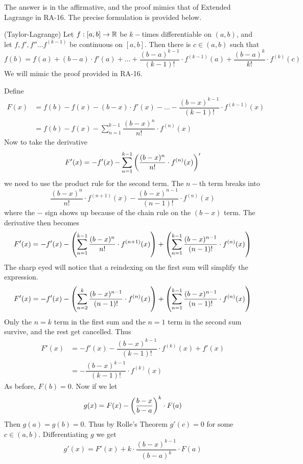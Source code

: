 The answer is in the affirmative, and the proof mimics that of Extended Lagrange in RA-16. The precise formulation is provided below.
\begin{SWP}{\thm}{(Taylor-Lagrange) Let $f:[a, b] \rightarrow \mathbb{R}$ be $k-$times differentiable on $(a, b)$, and let $f ,f', f'' \ldots f^{(k - 1)}$ be continuous on $[a, b]$. Then there is $c \in (a, b)$ such that
$$
f(b) = f(a) + (b - a)\cdot f'(a) + \ldots + \dfrac{(b - a)^{k - 1}}{(k - 1)!}\cdot f^{(k - 1)}(a) + \dfrac{(b - a)^k}{k!}\cdot f^{(k)}(c)
$$}We will mimic the proof provided in RA-16.

Define
\begin{align*}	
F(x) &= f(b) - f(x) - (b - x)\cdot f'(x) - \ldots - \dfrac{(b - x)^{k - 1}}{(k - 1)!}\cdot f^{(k - 1)}(x)\\
     &= f(b) - f(x) - \sum\limits_{n = 1}^{k - 1}\dfrac{(b - x)^n}{n!}\cdot f^{(n)}(x)
\end{align*}
Now to take the derivative
\begin{align*}
F'(x) = - f'(x) - \sum\limits_{n = 1}^{k - 1}\left ( {\dfrac{(b - x)^n}{n!}\cdot f^{(n)}(x)} \right )'
\end{align*}
we need to use the product rule for the second term. The $n-$th term breaks into
$$
\dfrac{(b - x)^n}{n!}\cdot f^{(n + 1)}(x) - \dfrac{(b - x)^{n - 1}}{(n - 1)!}\cdot f^{(n)}(x)
$$
where the $-$ sign shows up because of the chain rule on the $(b - x)$ term. The derivative then becomes
$$
F'(x) = -f'(x) - \left ( {\sum\limits_{n = 1}^{k - 1}\dfrac{(b - x)^n}{n!}\cdot f^{(n + 1)}(x)} \right ) + \left ( {\sum\limits_{n = 1}^{k - 1}\dfrac{(b - x)^{n - 1}}{(n - 1)!}\cdot f^{(n)}(x)} \right )
$$
The sharp eyed will notice that a reindexing on the first sum will simplify the expression.
$$
F'(x) = -f'(x) - \left ( {\sum\limits_{n = 2}^{k}\dfrac{(b - x)^{n - 1}}{(n - 1)!}\cdot f^{(n)}(x)} \right ) + \left ( {\sum\limits_{n = 1}^{k - 1}\dfrac{(b - x)^{n - 1}}{(n - 1)!}\cdot f^{(n)}(x)} \right )
$$
Only the $n = k$ term in the first sum and the $n = 1$ term in the second sum survive, and the rest get cancelled. Thus
\begin{align*}
F'(x) &= - f'(x) - \dfrac{(b - x)^{k - 1}}{(k - 1)!}\cdot f^{(k)}(x) + f'(x)\\
      &= - \dfrac{(b - x)^{k - 1}}{(k - 1)!}\cdot f^{(k)}(x)
\end{align*}
As before, $F(b) = 0$. Now if we let
$$
g(x) = F(x) - \left ( {\dfrac{b - x}{b - a}} \right )^k\cdot F(a)
$$
Then $g(a) = g(b) = 0$. Thus by Rolle's Theorem $g'(c) = 0$ for some $c \in (a, b)$. Differentiating $g$ we get
$$
g'(x) = F'(x) + k\cdot \dfrac{(b - x)^{k - 1}}{(b - a)^k}\cdot F(a)
$$
\end{SWP}
